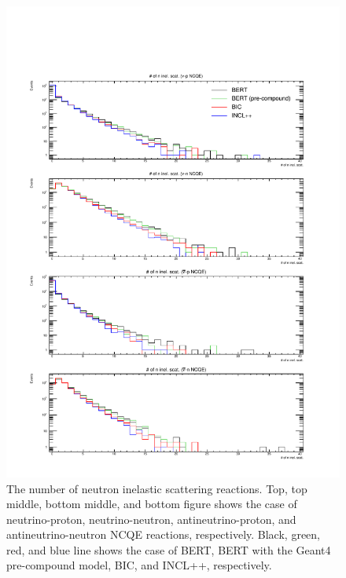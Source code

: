 \begin{figure}[h]
	\centering
	\includegraphics[width=16cm]{PDF/Secondary/Comparison_PreCompound/neutron/pdf1/Logy_NumIne}
	\caption[The number of neutron inelastic scattering reactions]{
	The number of neutron inelastic scattering reactions.
	Top, top middle, bottom middle, and bottom figure shows the case of neutrino-proton, neutrino-neutron, antineutrino-proton, and antineutrino-neutron NCQE reactions, respectively.
	Black, green, red, and blue line shows the case of BERT, BERT with the Geant4 pre-compound model, BIC, and INCL++, respectively.
	}\label{Others_neutron_Logy_NumIne}
\end{figure}

